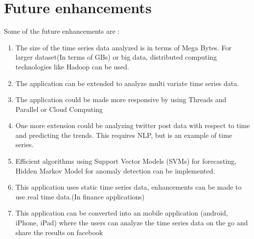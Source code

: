 \documentclass[12pt,a4paper]{report}
\begin{document}
\section{Future enhancements}
Some of the future enhancements are :
\begin{enumerate}
\item{The size of the  time series data analyzed is in terms of Mega Bytes. For larger dataset(In terms of GBs) or big data, distributed computing technologies like Hadoop can be used.}
\item{}The application can be extended to analyze multi variate time series data.
\item{The application could be made more responsive by using Threads and Parallel or Cloud Computing}
\item{One more extension could be analyzing twitter post data with respect to time and predicting the trends. This requires NLP, but is an example of time series.}
\item{Efficient algorithms using Support Vector Models (SVMs) for forecasting, Hidden Markov Model for anomaly detection can be implemented.}
\item{This application uses static time series data, enhancements can be made to use real time data.(In finance applications)}

\item{This application can be converted into an mobile application (android, iPhone, iPad) where the users can analyze the time series data on the go and share the results on facebook}

\end{enumerate}
\end{document}
